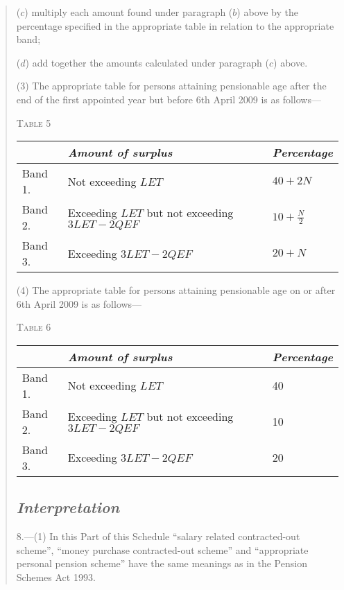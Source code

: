 \documentclass[12pt,a4paper]{article}
\begin{document}
\begin{quotation}
\begin{enumerate}
($c$) multiply each amount found under paragraph ($b$)  above by the percentage specified in the appropriate table in relation to the appropriate band;

($d$) add together the amounts calculated under paragraph ($c$)  above.
\end{enumerate}

(3) The appropriate table for persons attaining pensionable age after the end of the first appointed year but before 6th April 2009 is as follows—

\medskip
\pagebreak[3]

\noindent\textsc{Table 5}

{\noindent\footnotesize
\begin{tabulary}{\linewidth}{JJJ}
\hline
&\itshape Amount of surplus	&\itshape Percentage\\
\hline
Band 1. 	&Not exceeding $LET$	&$40 + 2N$\\
Band 2. 	&Exceeding $LET$ but not exceeding $3LET - 2QEF$	&$10 + \frac{N}{2}$\\
Band 3. 	&Exceeding $3LET - 2QEF$	&$20 + N$\\
\hline
\end{tabulary}

}

\medskip

(4) The appropriate table for persons attaining pensionable age on or after 6th April 2009 is as follows—

\medskip

\noindent\textsc{Table 6}

{\noindent\footnotesize
\begin{tabulary}{\linewidth}{JJJ}
\hline
&\itshape Amount of surplus	&\itshape Percentage\\
\hline
Band 1. 	&Not exceeding $LET$	&40\\
Band 2. 	&Exceeding $LET$ but not exceeding $3LET - 2QEF$	&10\\
Band 3. 	&Exceeding $3LET - 2QEF$	&20\\
\hline
\end{tabulary}

}

\subsection*{\itshape Interpretation}

8.---(1) In this Part of this Schedule “salary related contracted-out scheme”, “money purchase contracted-out scheme” and “appropriate personal pension scheme” have the same meanings as in the Pension Schemes Act 1993. 


\end{quotation}
\end{document}
